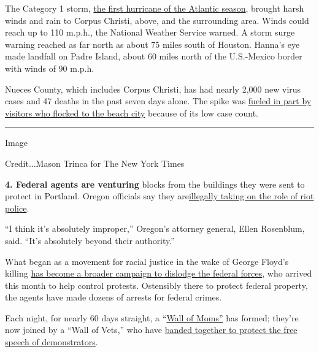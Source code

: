 The Category 1 storm,
\href{https://www.nytimes3xbfgragh.onion/2020/07/25/us/hanna-storm-texas.html}{the
first hurricane of the Atlantic season}, brought harsh winds and rain to
Corpus Christi, above, and the surrounding area. Winds could reach up to
110 m.p.h., the National Weather Service warned. A storm surge warning
reached as far north as about 75 miles south of Houston. Hanna's eye
made landfall on Padre Island, about 60 miles north of the U.S.-Mexico
border with winds of 90 m.p.h.

Nueces County, which includes Corpus Christi, has had nearly 2,000 new
virus cases and 47 deaths in the past seven days alone. The spike was
\href{https://www.nytimes3xbfgragh.onion/2020/07/11/us/coronavirus-texas-corpus-christi.html?smid=tw-nytimes\&smtyp=cur}{fueled
in part by visitors who flocked to the beach city} because of its low
case count.

\begin{center}\rule{0.5\linewidth}{\linethickness}\end{center}

Image

Credit...Mason Trinca for The New York Times

\textbf{4. Federal agents are venturing} blocks from the buildings they
were sent to protect in Portland. Oregon officials say they
are\href{https://www.nytimes3xbfgragh.onion/2020/07/25/us/portland-federal-legal-jurisdiction-courts.html}{illegally
taking on the role of riot police}.

``I think it's absolutely improper,'' Oregon's attorney general, Ellen
Rosenblum, said. ``It's absolutely beyond their authority.''

What began as a movement for racial justice in the wake of George
Floyd's killing
\href{https://www.nytimes3xbfgragh.onion/article/portland-protests-explained-protesters.html}{has
become a broader campaign to dislodge the federal forces}, who arrived
this month to help control protests. Ostensibly there to protect federal
property, the agents have made dozens of arrests for federal crimes.

Each night, for nearly 60 days straight, a
``\href{https://www.nytimes3xbfgragh.onion/2020/07/25/world/americas/protest-moms-power-police.html}{Wall
of Moms''} has formed; they're now joined by a ``Wall of Vets,'' who
have
\href{https://www.nytimes3xbfgragh.onion/2020/07/25/us/a-wall-of-vets-joins-the-front-lines-of-portland-protests.html}{banded
together to protect the free speech of demonstrators}.

